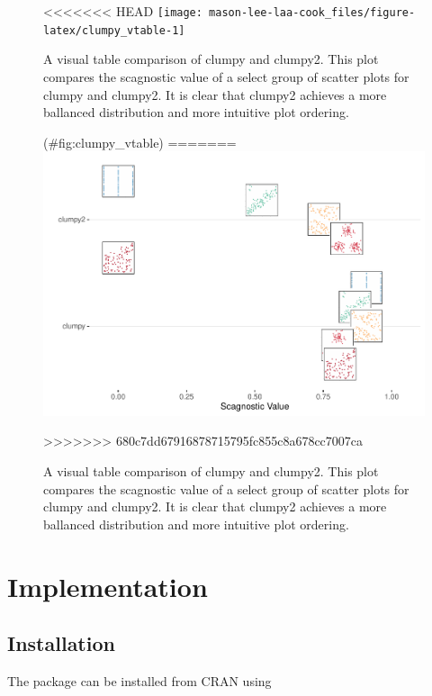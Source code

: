 \begin{Schunk}
\begin{figure}
<<<<<<< HEAD
\texttt{[image: mason-lee-laa-cook\_files/figure-latex/clumpy\_vtable-1]} \caption[A visual table comparison of clumpy and clumpy2]{A visual table comparison of clumpy and clumpy2. This plot compares the scagnostic value of a select group of scatter plots for clumpy and clumpy2. It is clear that clumpy2 achieves a more ballanced distribution and more intuitive plot ordering.}(\#fig:clumpy_vtable)
=======
\includegraphics[width=1\linewidth]{mason-lee-laa-cook_files/figure-latex/clumpy-vtable-1} \caption[A visual table comparison of clumpy and clumpy2]{A visual table comparison of clumpy and clumpy2. This plot compares the scagnostic value of a select group of scatter plots for clumpy and clumpy2. It is clear that clumpy2 achieves a more ballanced distribution and more intuitive plot ordering.}\label{fig:clumpy-vtable}
>>>>>>> 680c7dd67916878715795fc855c8a678cc7007ca
\end{figure}
\end{Schunk}

\hypertarget{implementation}{%
\section{Implementation}\label{implementation}}

\hypertarget{installation}{%
\subsection{Installation}\label{installation}}

The package can be installed from CRAN using


